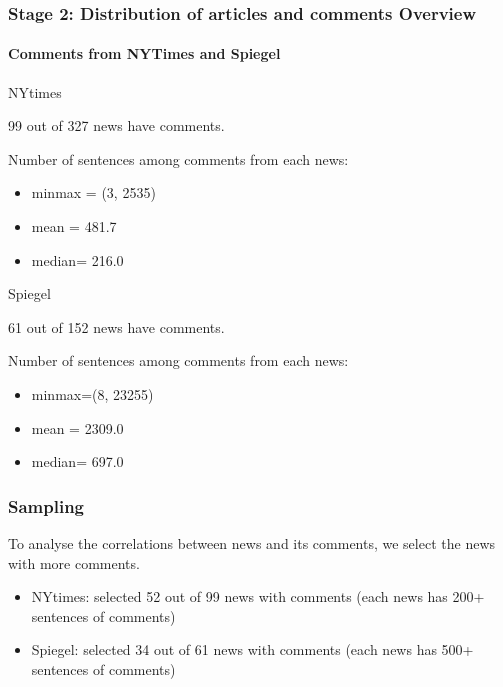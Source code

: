 \documentclass{tum-presentation}
\begin{document}
\begin{frame}
  \frametitle{Stage 2: Distribution of articles and comments Overview }
  \framesubtitle{Comments from NYTimes and Spiegel }
  \begin{description}
 \large
 \item NYtimes
    \item 99 out of 327 news have comments.
    \item Number of sentences among comments from each news:
    \item \begin{itemize}
      \item minmax = (3, 2535)
      \item mean = 481.7
      \item median= 216.0
    \end{itemize}
  \end{description}
  \vspace{0.7cm}
  \begin{description}
    \large
    \item Spiegel
       \item 61 out of 152 news have comments.
       \item Number of sentences among comments from each news:
       \item \begin{itemize}
         \item minmax=(8, 23255)
         \item mean = 2309.0
         \item median= 697.0
       \end{itemize}
     \end{description}
\end{frame}

\begin{frame}
  \frametitle{Sampling}
  \begin{description}
 \large
    \item To analyse the correlations between news and its comments, we select the news with more comments.
    \item \begin{itemize}
    \item NYtimes: selected 52 out of 99 news with comments (each news has 200+ sentences of comments)
    \item Spiegel: selected 34 out of 61 news with comments (each news has 500+ sentences of comments)
  \end{itemize}
  \end{description}
\end{frame}
\end{document}
